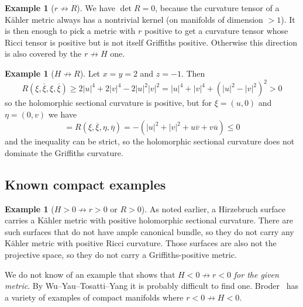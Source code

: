 \documentclass[10pt,a4paper]{amsart}
\theoremstyle{definition}
\newtheorem{exam}[theo]{Example}
\def\ov#1{\overline{#1}}
\begin{document}
\begin{exam}[$r \not\to R$]
We have $\det R = 0$, because the curvature tensor of a K\"ahler metric
always has a nontrivial kernel (on manifolds of dimension $> 1$).
It is then enough to pick a metric with $r$ positive
to get a curvature tensor whose Ricci tensor is positive but is not itself
Griffiths positive.
Otherwise this direction is also covered by the $r \not\to H$ one.
\end{exam}

\begin{exam}[$H \not\to R$]
Let $x = y = 2$ and $z = -1$.
Then
$$
R(\xi, \ov \xi, \xi, \ov \xi)
\geq 2 |u|^4 + 2 |v|^4 - 2 |u|^2|v|^2
= |u|^4 + |v|^4 + (|u|^2 - |v|^2)^2 > 0
$$
so the holomorphic sectional curvature is positive, but
for $\xi = (u,0)$ and $\eta = (0,v)$ we have
$$
= R(\xi, \ov \xi, \eta, \ov \eta)
= - (|u|^2 + |v|^2 + u \ov v + v \ov u)
\leq 0
$$
and the inequality can be strict, so the holomorphic sectional curvature does
not dominate the Griffiths curvature.
\end{exam}


\subsection*{Known compact examples}


\begin{exam}[$H > 0 \not\to r > 0$ or $R > 0$]
As noted earlier, a Hirzebruch surface carries a K\"ahler metric with positive
holomorphic sectional curvature. There are such surfaces that do not have ample
canonical bundle, so they do not carry any K\"ahler metric with positive Ricci
curvature.
Those surfaces are also not the projective space, so they do not carry a
Griffiths-positive metric.
\end{exam}

We do not know of an example that shows that $H < 0 \not\to r < 0$ \emph{for
the given metric}.
By Wu--Yau--Tosatti--Yang it is probably difficult to find one.
Broder~\cite{broder} has a variety of examples of compact manifolds where $r <
0 \not\to H<0$.



\end{document}
